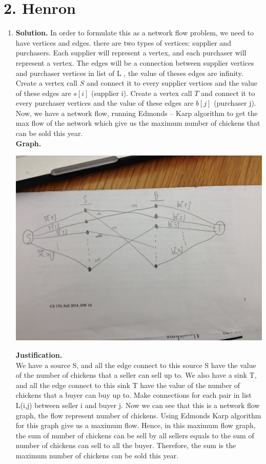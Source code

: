 \documentclass[11pt]{article}
\newenvironment{qparts}{\begin{enumerate}[{(}a{)}]}{\end{enumerate}}
\begin{document}
\section*{2. Henron}
\begin{qparts}
\item 
\textbf{Solution.}
In order to formulate this as a network flow problem, we need to have vertices and edges. there are two types of vertices: supplier and purchasers. Each supplier will represent a vertex, and each purchaser will represent a vertex. The edges will be a connection between supplier vertices and purchaser vertices in list of L , the value of theses edges are infinity. Create a vertex call $S$ and connect it to every supplier vertices and the value of these edges are $s[i]$ (supplier i). Create a vertex call $T$ and connect it to every purchaser vertices and the value of these edges are $b[j]$ (purchaser j). Now, we have a network flow, running Edmonds – Karp algorithm to get the max flow of the network which give us the maximum number of chickens that can be sold this year.
\\
\textbf{Graph.}
   \begin{center}
   \includegraphics[scale=0.1]{p2a.JPG}
   \end{center}
\textbf{Justification.}\\
We have a source S, and all the edge connect to this source S have the value of the number of chickens that a seller can sell up to. We also have a sink T, and all the edge connect to this sink T have the value of the number of chickens that a buyer can buy up to. Make connections for each pair in list L(i,j) between seller i and buyer j. Now we can see that this is a network flow graph, the flow represent number of chickens. Using Edmonds Karp algorithm for this graph give us a maximum flow. Hence, in this maximum flow graph, the sum of number of chickens can be sell by all sellers equals to the sum of number of chickens can sell to all the buyer. Therefore, the sum is the maximum number of chickens can be sold this year. 

\end{qparts}
\end{document}
